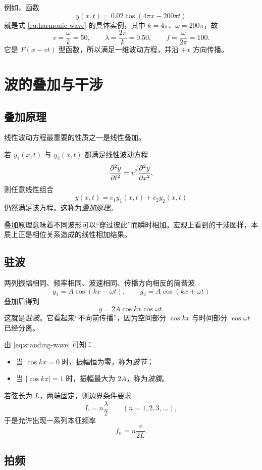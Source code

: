 例如，函数
\[
y(x,t)=0.02\cos(4\pi x-200\pi t)
\]
就是式 \eqref{eq:harmonic-wave} 的具体实例，其中 $k=4\pi$、$\omega=200\pi$，故
\[
v=\frac{\omega}{k}=50,
\qquad
\lambda=\frac{2\pi}{k}=0.50,
\qquad
f=\frac{\omega}{2\pi}=100.
\]
它是 $F(x-vt)$ 型函数，所以满足一维波动方程，并沿 $+x$ 方向传播。

\section{波的叠加与干涉}

\subsection{叠加原理}

线性波动方程最重要的性质之一是线性叠加。

\begin{law}
若 $y_1(x,t)$ 与 $y_2(x,t)$ 都满足线性波动方程
\[
\pdv[2]{y}{t}=v^2\pdv[2]{y}{x},
\]
则任意线性组合
\[
y(x,t)=c_1y_1(x,t)+c_2y_2(x,t)
\]
仍然满足该方程。这称为\emph{叠加原理}。
\end{law}

叠加原理意味着不同波形可以“穿过彼此”而瞬时相加。宏观上看到的干涉图样，本质上正是相位关系造成的线性相加结果。

\subsection{驻波}

两列振幅相同、频率相同、波速相同、传播方向相反的简谐波
\[
y_1=A\cos(kx-\omega t),
\qquad
y_2=A\cos(kx+\omega t)
\]
叠加后得到
\begin{equation}
 y=2A\cos kx\cos\omega t.
\label{eq:standing-wave}
\end{equation}
这就是\emph{驻波}。它看起来“不向前传播”，因为空间部分 $\cos kx$ 与时间部分 $\cos\omega t$ 已经分离。

由 \eqref{eq:standing-wave} 可知：
\begin{itemize}
  \item 当 $\cos kx=0$ 时，振幅恒为零，称为\emph{波节}；
  \item 当 $|\cos kx|=1$ 时，振幅最大为 $2A$，称为\emph{波腹}。
\end{itemize}

若弦长为 $L$，两端固定，则边界条件要求
\[
L=n\frac{\lambda}{2}
\qquad (n=1,2,3,\dots),
\]
于是允许出现一系列本征频率
\[
f_n=n\frac{v}{2L}.
\]

\subsection{拍频}

